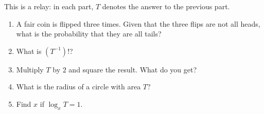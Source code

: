 This is a relay: in each part, $T$ denotes the answer to the previous part.
\begin{enumerate}
\item A fair coin is flipped three times. Given that the three flips are not all heads, what is the probability that they are all tails?
\item What is $\left(T^{-1}\right)!$?
\item Multiply $T$ by $2$ and square the result. What do you get?
\item What is the radius of a circle with area $T$?
\item Find $x$ if $\log_x T=1$.
\end{enumerate}
